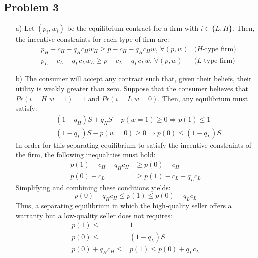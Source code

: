 \documentclass{article}
\begin{document}

\subsection*{Problem 3}

\begin{itemize}
	\item[a)] Let $(p_i,w_i)$ be the equilibrium contract for a firm with ${i\in\{L,H\}}$. Then, the incentive constraints for each type of firm are:
		\begin{align*}
			&p_H - c_H - q_Hc_Hw_H	\geq p - c_H - q_Hc_Hw\text{, }\forall(p,w)		&\text{(}H\text{-type firm)}	\\
			&p_L - c_L - q_Lc_Lw_L	\geq p - c_L - q_Lc_Lw\text{, }\forall(p,w)		&\text{(}L\text{-type firm)}
		\end{align*}
	
	
	\item[b)] The consumer will accept any contract such that, given their beliefs, their utility is weakly greater than zero. Suppose that the consumer believes that ${Pr(i=H|w=1)=1}$ and ${Pr(i=L|w=0)}$. Then, any equilibrium must satisfy:
	\begin{align*}
		&(1-q_H)S + q_HS - p(w=1)\geq 0	\Rightarrow p(1) \leq 1			\\
		&(1-q_L)S - p(w=0) \geq 0		\Rightarrow p(0) \leq (1-q_L)S 
	\end{align*}
	In order for this separating equilibrium to satisfy the incentive constraints of the firm, the following inequalities must hold:
		\begin{align*}
			p(1) - c_H - q_Hc_H	&\geq p(0) - c_H			\\
			p(0) - c_L 			&\geq p(1) - c_L - q_Lc_L
		\end{align*}
		Simplifying and combining these conditions yields:
		\[
			p(0) + q_Hc_H \leq p(1) \leq p(0) + q_Lc_L
		\]
		Thus, a separating equilibrium in which the high-quality seller offers a warranty but a low-quality seller does not requires:
		\begin{align*}
			p(1) \leq &1	\\ p(0) \leq &(1-q_L)S		\\
			p(0) + q_Hc_H \leq &p(1) \leq p(0) + q_Lc_L
		\end{align*}
		
\end{itemize}

\end{document}
